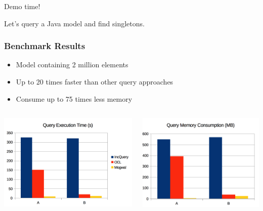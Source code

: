 \documentclass[10pt]{beamer}
\begin{document}
\begin{frame}[standout]
  Demo time!

  Let's query a Java model and find singletons.
\end{frame}

\begin{frame}[c]\frametitle{Benchmark Results}

  \begin{itemize}
	\item Model containing 2 million elements
	\item Up to 20 times faster than other query approaches
	\item Consume up to 75 times less memory
  \end{itemize}
  \begin{columns}
	  \begin{column}{0.5\textwidth}
	    \begin{center}
	      \includegraphics[width=\textwidth]{mogwai-benchmark-cpu.png}
	    \end{center}
	  \end{column}
	  \begin{column}{0.5\textwidth}
	    \begin{center}
	      \includegraphics[width=\textwidth]{mogwai-benchmark-memory.png}
	    \end{center}
	  \end{column}
  \end{columns}


\end{frame}
\end{document}
